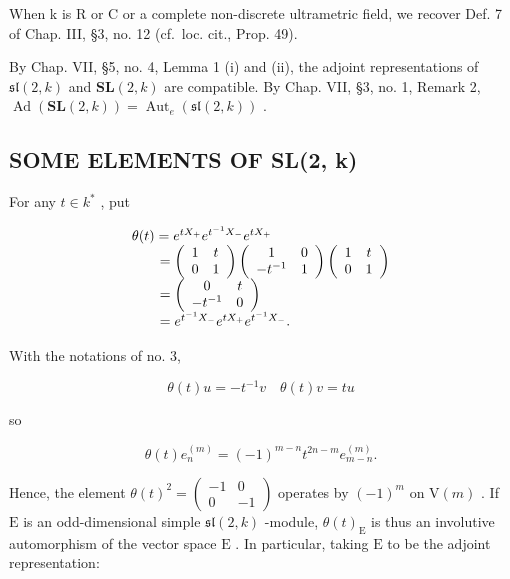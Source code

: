 When k is R or C or a complete non-discrete ultrametric field, we recover Def. 7 of Chap. III, §3, no. 12 (cf.~loc. cit., Prop. 49).

By Chap. VII, §5, no. 4, Lemma 1 (i) and (ii), the adjoint representations of \(\mathfrak{sl}(2,k)\) and \(\mathbf{SL}(2,k)\) are compatible. By Chap. VII, §3, no. 1, Remark 2, \(\operatorname{Ad}(\mathbf{SL}(2,k)) = \operatorname{Aut}_e(\mathfrak{sl}(2,k))\) .

\subsection{SOME ELEMENTS OF SL(2, k)}

For any \(t\in k^{*}\) , put

\[
\begin{array}{l} \theta (t) = e ^ {t X _ {+}} e ^ {t ^ {- 1} X _ {-}} e ^ {t X _ {+}} \\ \qquad = \left( \begin{array}{c c} 1 & t \\ 0 & 1 \end{array} \right) \left( \begin{array}{c c} 1 & 0 \\ - t ^ {- 1} & 1 \end{array} \right) \left( \begin{array}{c c} 1 & t \\ 0 & 1 \end{array} \right) \\ \qquad = \left( \begin{array}{c c} 0 & t \\ - t ^ {- 1} & 0 \end{array} \right) \\ \qquad = e ^ {t ^ {- 1} X _ {-}} e ^ {t X _ {+}} e ^ {t ^ {- 1} X _ {-}}. \end{array}
\]

With the notations of no. 3,

\[
\theta (t) u = - t ^ {- 1} v \quad \theta (t) v = t u
\]

so

\[
\theta (t) e _ {n} ^ {(m)} = (- 1) ^ {m - n} t ^ {2 n - m} e _ {m - n} ^ {(m)}.\tag{4}
\]

Hence, the element \(\theta(t)^2 = \left( \begin{array}{cc} -1 & 0 \\ 0 & -1 \end{array} \right)\) operates by \((-1)^m\) on \(\mathrm{V}(m)\) . If \(\mathrm{E}\) is an odd-dimensional simple \(\mathfrak{sl}(2,k)\) -module, \(\theta(t)_{\mathrm{E}}\) is thus an involutive automorphism of the vector space \(\mathrm{E}\) . In particular, taking \(\mathrm{E}\) to be the adjoint representation:

